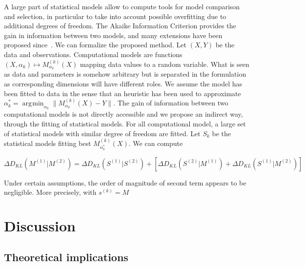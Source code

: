 \documentclass[Royal,sageh,times]{sagej}
\newcommand{\norm}[1]{\| #1 \|}
\DeclareMathOperator*{\argmin}{\arg\!\min}
\begin{document}

A large part of statistical models allow to compute tools for model comparison and selection, in particular to take into account possible overfitting due to additional degrees of freedom. The Akaike Information Criterion provides the gain in information between two models, and many extensions have been proposed since~\cite{}.%
We can formalize the proposed method. Let $(X,Y)$ be the data and observations. Computational models are functions $(X,\alpha_k) \mapsto M_{\alpha_k}^{(k)}(X)$ mapping data values to a random variable. What is seen as data and parameters is somehow arbitrary but is separated in the formulation as corresponding dimensions will have different roles. We assume the model has been fitted to data in the sense that an heuristic has been used to approximate $\alpha^{\ast}_k = \argmin_{\alpha_k}\norm{M_{\alpha_k}^{(k)}(X) - Y}$. The gain of information between two computational models is not directly accessible and we propose an indirect way, through the fitting of statistical models. For all computational model, a large set of statistical models with similar degree of freedom are fitted. %
Let $S_k$ be the statistical models fitting best $M^{(k)}_{\alpha^{\ast}_k}(X)$. We can compute

\[
\Delta D_{KL} \left(M^{(1)}|M^{(2)}\right) = \Delta D_{KL} \left(S^{(1)}|S^{(2)}\right) + \left[ \Delta D_{KL} \left(S^{(2)}|M^{(1)}\right) + \Delta D_{KL} \left(S^{(1)}|M^{(2)}\right) \right]
\]

Under certain assumptions, the order of magnitude of second term appears to be negligible. More precisely, with $s^{(k)}=M$


\section{Discussion}

% 
%
%



\subsection{Theoretical implications}
\end{document}
